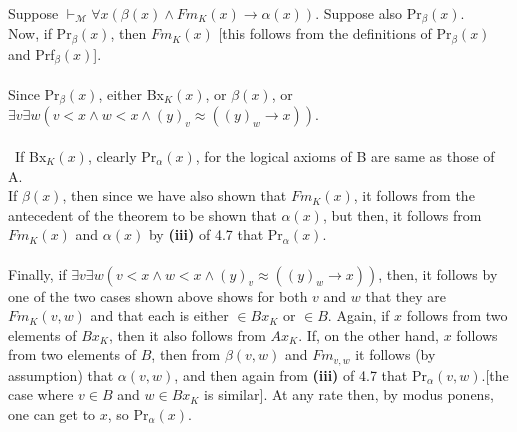 \documentclass{article}
\begin{document}
Suppose $\vdash_{\mathscr{M}} \forall x (\beta(x) \wedge Fm_{K}(x) \rightarrow \alpha(x))$. Suppose also Pr$_{\beta}(x)$.\\
Now, if Pr$_{\beta}(x)$, then $Fm_{K}(x)$ [this follows from the definitions of Pr$_{\beta}(x)$ and Prf$_{\beta}(x)$].\\\\
Since Pr$_{\beta}(x)$, either Bx$_{K}(x)$, or $\beta(x)$, or\\ $\exists v \exists w ( v < x \wedge w < x \wedge (y)_{v} \approx  ((y)_{w} \rightarrow x))$.\\\\\
If Bx$_{K}(x)$, clearly Pr$_{\alpha}(x)$, for the logical axioms of B are same as those of A.\\
If $\beta(x)$, then since we have also shown that  $Fm_{K}(x)$, it follows from the antecedent of the theorem to be shown that $\alpha(x)$, but then, it follows from $Fm_{K}(x)$ and $\alpha(x)$ by \textbf{(iii)} of 4.7 that Pr$_{\alpha}(x)$.\\\\
Finally, if $\exists v \exists w ( v < x \wedge w < x \wedge (y)_{v} \approx  ((y)_{w} \rightarrow x))$, then, it follows by one of the two cases shown above shows for both $v$ and $w$ that they are $Fm_{K}(v, w)$ and that each is either  $\in Bx_{K}$ or $\in B$. Again, if $x$ follows from two elements of $Bx_{K}$, then it also follows from $Ax_{K}$. If, on the other hand, $x$ follows from two elements of $B$, then from $\beta(v, w)$ and $Fm_{v, w}$ it follows (by assumption) that $\alpha(v, w)$, and then again from \textbf{(iii)} of 4.7 that Pr$_{\alpha}(v, w)$.[the case where $ v\in B$ and $w \in Bx_{K}$ is similar]. At any rate then, by modus ponens, one can get to $x$, so  Pr$_{\alpha}(x)$.
\end{document}
